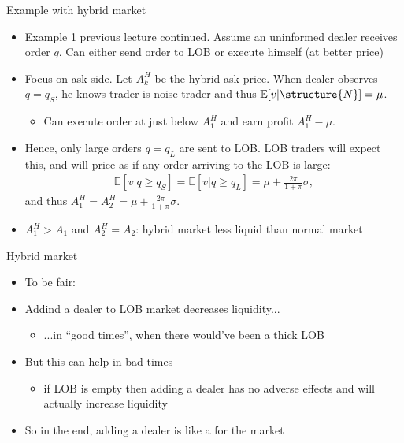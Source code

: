 \documentclass[english,10pt
,aspectratio=169
]{beamer}
\begin{document}
\begin{frame}{Example with hybrid market}
	\begin{itemize}
		\item Example 1 previous lecture continued. Assume an uninformed dealer receives order $q$. Can either send order to LOB or execute himself (at better price) 
		\item Focus on ask side. Let $A^H_k$ be the hybrid ask price. When dealer observes $q=q_S$, he knows trader is noise trader and thus $\mathbb{E}[v|\structure{N}]=\mu$. 
		\begin{itemize}
			\item Can execute order at just below $A^H_1$ and earn profit $A^H_1-\mu$.
		\end{itemize}
		\item Hence, only large orders $q=q_L$ are sent to LOB. LOB traders will expect this, and will price as if any order arriving to the LOB is large:
		\begin{align*}
		\mathbb{E}[v|q \ge q_S]=\mathbb{E}[v|q \ge q_L]=\mu+\frac{2\pi}{1+\pi} \sigma,
		\end{align*}
		and thus $A^H_1=A^H_2=\mu+\frac{2\pi}{1+\pi} \sigma$.
		\item $A^H_1>A_1$ and $A^H_2=A_2$: hybrid market less liquid than normal market
	\end{itemize}
\end{frame}


\begin{frame}{Hybrid market}
	\begin{itemize}
		\item To be fair:
		\item Addind a dealer to LOB market decreases liquidity...
		\begin{itemize}
			\item ...in ``good times'', when there would've been a thick LOB
		\end{itemize}
		\item But this can help in bad times
		\begin{itemize}
			\item if LOB is empty then adding a dealer has no adverse effects and will actually increase liquidity
		\end{itemize}
		\item So in the end, adding a dealer is like a  for the market
	\end{itemize}
\end{frame}
\end{document}
